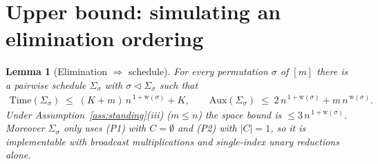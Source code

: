 \documentclass[11pt]{article}
\newcommand{\wid}{\mathrm{w}}
\newcommand{\Time}{\mathrm{Time}}
\newcommand{\Aux}{\mathrm{Aux}}
\theoremstyle{plain}
\newtheorem{lemma}{Lemma}
\theoremstyle{definition}
\theoremstyle{remark}
\begin{document}
\section{Upper bound: simulating an elimination ordering}
\label{sec:upper}

\begin{lemma}[Elimination $\Rightarrow$ schedule]
\label{lem:elim-to-schedule}
For every permutation $\sigma$ of $[m]$ there is a pairwise schedule
$\Sigma_\sigma$ with $\sigma \vartriangleleft \Sigma_\sigma$ such that
\begin{align*}
   \Time(\Sigma_\sigma) \;\le\; (K+m)\, n^{\,1+\wid(\sigma)} + K,
   \qquad
   \Aux(\Sigma_\sigma) \;\le\; 2\,n^{\,1+\wid(\sigma)} + m\, n^{\,\wid(\sigma)} .
\end{align*}
Under Assumption~\ref{ass:standing}(iii) ($m\le n$) the space bound is
$\le 3\,n^{\,1+\wid(\sigma)}$.  Moreover $\Sigma_\sigma$ only uses (P1)
with $C = \emptyset$ and (P2) with $|C|=1$, so it is implementable with
broadcast multiplications and single-index unary reductions alone.
\end{lemma}
\end{document}
